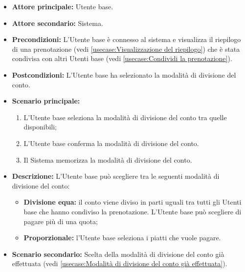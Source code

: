 \label{usecase:Selezione della modalità di divisione del conto}
\begin{itemize}
	\item \textbf{Attore principale:} Utente base.

	\item \textbf{Attore secondario:} Sistema.

	\item \textbf{Precondizioni:}
	      L'Utente base è connesso al sistema e visualizza il riepilogo di una
	      prenotazione (vedi \autoref{usecase:Visualizzazione del riepilogo})
	      che è stata condivisa con altri Utenti base (vedi
	      \autoref{usecase:Condividi la prenotazione}).

	\item \textbf{Postcondizioni:}
	      L'Utente base ha selezionato la modalità di divisione del conto.
	\item \textbf{Scenario principale:}
	      \begin{enumerate}
		      \item L'Utente base seleziona la modalità di divisione del conto
		            tra quelle disponibili;

		      \item L'Utente base conferma la modalità di divisione del conto.

		      \item Il Sistema memorizza la modalità di divisione del conto.
	      \end{enumerate}

	\item \textbf{Descrizione:}
	      L'Utente base può scegliere tra le seguenti modalità di divisione del conto:
	      \begin{itemize}
		      \item \textbf{Divisione equa:} il conto viene diviso in parti
		            uguali tra tutti gli Utenti base che hanno condiviso la
		            prenotazione. L'Utente base può scegliere di pagare più di
		            una quota;

		      \item \textbf{Proporzionale:} l'Utente base seleziona i piatti che vuole
		            pagare.
	      \end{itemize}

	\item \textbf{Scenario secondario:}
	      Scelta della modalità di divisione del conto già effettuata (vedi
	      \autoref{usecase:Modalità di divisione del conto già effettuata}).


\end{itemize}
